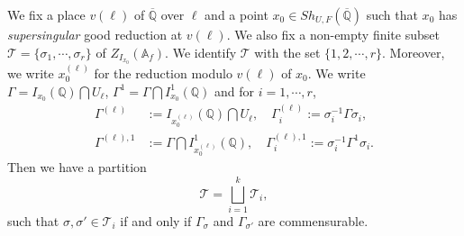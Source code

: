 \documentclass[11pt,oneside,reqno]{amsart}
\newcommand{\A}{\mathbb{A}}
\newcommand{\Q}{\mathbb{Q}}
\newcommand{\Tcal}{\mathcal{T}}
\theoremstyle{plain}
\begin{document}
	We fix a place $v(\ell)$ of $\overline{\Q}$ over $\ell$ and a point $x_0\in Sh_{U,F}(\overline{\Q})$ such that $x_0$ has \emph{supersingular} good reduction at $v(\ell)$. We also fix a non-empty finite subset $\Tcal=\{\sigma_1,\cdots,\sigma_r\}$ of $Z_{I_{x_0}}(\A_f)$. We identify $\Tcal$ with the set $\{1,2,\cdots,r\}$.
	Moreover, we write $x_0^{(\ell)}$ for the reduction modulo $v(\ell)$ of $x_0$. We write $\Gamma=I_{x_0}(\Q)\bigcap U_\ell$, $\Gamma^1=\Gamma\bigcap I_{x_0}^1(\Q)$ and for $i=1,\cdots,r$,
	\begin{align*}
		\Gamma^{(\ell)}
		&
		:=I_{x_0^{(\ell)}}(\Q)\bigcap U_\ell,
		\quad
		\Gamma_i^{(\ell)}:=\sigma_i^{-1}\Gamma\sigma_i,
		\\
		\Gamma^{(\ell),1}
		&
		:=\Gamma\bigcap I_{x_0^{(\ell)}}^1(\Q),
		\quad
		\Gamma^{(\ell),1}_i:=\sigma_i^{-1}\Gamma^1\sigma_i.
	\end{align*}	
	Then we have a partition
	\[
	\Tcal=\bigsqcup_{i=1}^k\Tcal_{i},
	\]
	such that $\sigma,\sigma'\in\Tcal_{i}$ if and only if
	$\Gamma_\sigma$ and $\Gamma_{\sigma'}$ are commensurable.
	
	
	
\end{document}

